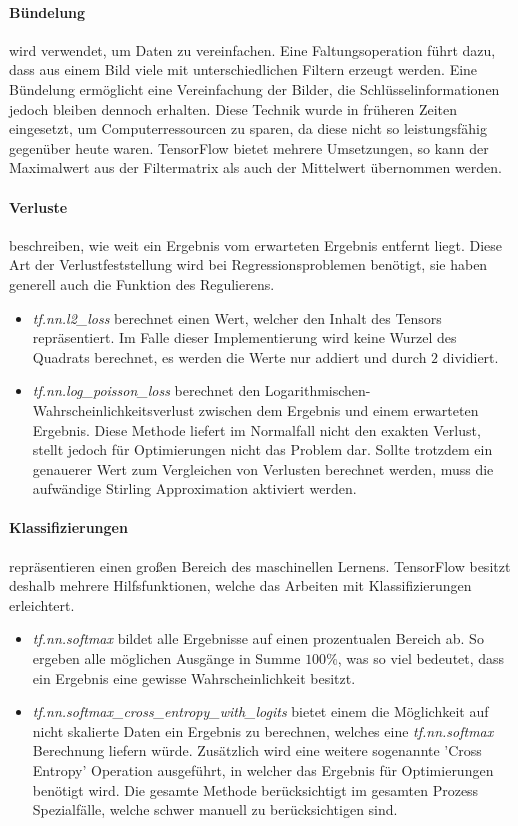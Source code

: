 \paragraph{Bündelung} wird verwendet, um Daten zu vereinfachen. 
Eine Faltungsoperation führt dazu, dass aus einem Bild viele mit unterschiedlichen Filtern erzeugt werden.
Eine Bündelung ermöglicht eine Vereinfachung der Bilder, die Schlüsselinformationen jedoch bleiben dennoch erhalten. 
Diese Technik wurde in früheren Zeiten eingesetzt, um Computerressourcen zu sparen, da diese nicht so leistungsfähig gegenüber heute waren. 
TensorFlow bietet mehrere Umsetzungen, so kann der Maximalwert aus der Filtermatrix als auch der Mittelwert übernommen werden. 

\paragraph{Verluste} beschreiben, wie weit ein Ergebnis vom erwarteten Ergebnis entfernt liegt. 
Diese Art der Verlustfeststellung wird bei Regressionsproblemen benötigt, sie haben generell auch die Funktion des Regulierens.
\begin{itemize}
	\item \textit{tf.nn.l2\_loss} berechnet einen Wert, welcher den Inhalt des Tensors repräsentiert. 
	Im Falle dieser Implementierung wird keine Wurzel des Quadrats berechnet,  es werden die Werte nur addiert und durch $2$ dividiert.
	\item \textit{tf.nn.log\_poisson\_loss} berechnet den Logarithmischen-Wahrscheinlichkeitsverlust zwischen dem Ergebnis und einem erwarteten Ergebnis. 
	Diese Methode liefert im Normalfall nicht den exakten Verlust, stellt jedoch für Optimierungen nicht das Problem dar. 
	Sollte trotzdem ein genauerer Wert zum Vergleichen von Verlusten berechnet werden, muss die aufwändige Stirling Approximation \cite{feller1968introduction} aktiviert werden. 
\end{itemize}

\paragraph{Klassifizierungen} repräsentieren einen großen Bereich des maschinellen Lernens. 
TensorFlow besitzt deshalb mehrere Hilfsfunktionen, welche das Arbeiten mit Klassifizierungen erleichtert. 
\begin{itemize}
	\item \textit{tf.nn.softmax} bildet alle Ergebnisse auf einen prozentualen Bereich ab. 
	So ergeben alle möglichen Ausgänge in Summe $100\%$, was so viel bedeutet, dass ein Ergebnis eine gewisse Wahrscheinlichkeit besitzt. 
	\item \textit{tf.nn.softmax\_cross\_entropy\_with\_logits} bietet einem die Möglichkeit auf nicht skalierte Daten ein Ergebnis zu berechnen, welches eine \textit{tf.nn.softmax} Berechnung liefern würde. 
	Zusätzlich wird eine weitere sogenannte 'Cross Entropy' Operation ausgeführt, in welcher das Ergebnis für Optimierungen benötigt wird. 
	Die gesamte Methode berücksichtigt im gesamten Prozess Spezialfälle, welche schwer manuell zu berücksichtigen sind. 
\end{itemize}
\phantom \newline

